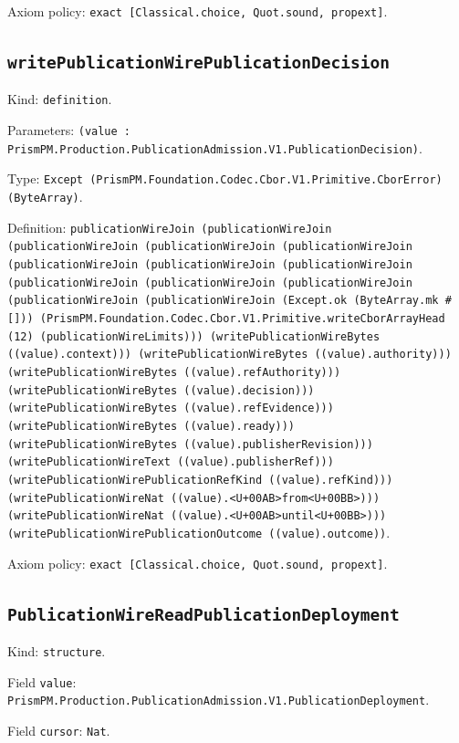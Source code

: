 \documentclass[11pt]{article}
\begin{document}
\noindent Axiom policy: \texttt{exact [Classical.choice, Quot.sound, propext]}.\par
\subsection*{\texttt{writePublicationWirePublicationDecision}}
\noindent Kind: \texttt{definition}.\par
\noindent Parameters: \texttt{(value : PrismPM.Production.PublicationAdmission.V1.PublicationDecision)}.\par
\noindent Type: \texttt{Except (PrismPM.Foundation.Codec.Cbor.V1.Primitive.CborError) (ByteArray)}.\par
\noindent Definition: \texttt{publicationWireJoin (publicationWireJoin (publicationWireJoin (publicationWireJoin (publicationWireJoin (publicationWireJoin (publicationWireJoin (publicationWireJoin (publicationWireJoin (publicationWireJoin (publicationWireJoin (publicationWireJoin (publicationWireJoin (Except.ok (ByteArray.mk \#[])) (PrismPM.Foundation.Codec.Cbor.V1.Primitive.writeCborArrayHead (12) (publicationWireLimits))) (writePublicationWireBytes ((value).context))) (writePublicationWireBytes ((value).authority))) (writePublicationWireBytes ((value).refAuthority))) (writePublicationWireBytes ((value).decision))) (writePublicationWireBytes ((value).refEvidence))) (writePublicationWireBytes ((value).ready))) (writePublicationWireBytes ((value).publisherRevision))) (writePublicationWireText ((value).publisherRef))) (writePublicationWirePublicationRefKind ((value).refKind))) (writePublicationWireNat ((value).<U+00AB>from<U+00BB>))) (writePublicationWireNat ((value).<U+00AB>until<U+00BB>))) (writePublicationWirePublicationOutcome ((value).outcome))}.\par
\noindent Axiom policy: \texttt{exact [Classical.choice, Quot.sound, propext]}.\par
\subsection*{\texttt{PublicationWireReadPublicationDeployment}}
\noindent Kind: \texttt{structure}.\par
\noindent Field \texttt{value}: \texttt{PrismPM.Production.PublicationAdmission.V1.PublicationDeployment}.\par
\noindent Field \texttt{cursor}: \texttt{Nat}.\par
\end{document}
